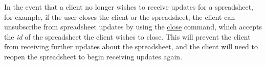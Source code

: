 In the event that a client no longer wishes to receive updates for a 
spreadsheet, for example, if the user closes the client or the spreadsheet, 
the client can unsubscribe from spreadsheet updates by using the \hyperref[sec:message:close]{close} 
command, which accepts the \emph{id} of the spreadsheet the client wishes to 
close. This will prevent the client from receiving further updates about the 
spreadsheet, and the client will need to reopen the spreadsheet to begin 
receiving updates again.

